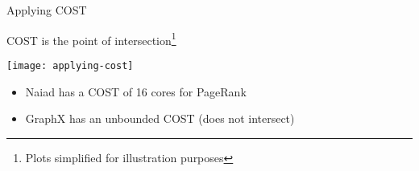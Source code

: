 \begin{frame}[t]{Applying COST}

  \vspace{0.25cm}

  COST is the point of intersection\footnote{Plots simplified for illustration purposes}

  \begin{center}
    \texttt{[image: applying-cost]}
  \end{center}

  \pause

  \begin{itemize}
    \item Naiad has a COST of 16 cores for PageRank
    \item GraphX has an unbounded COST (does not intersect)
  \end{itemize}
\end{frame}
